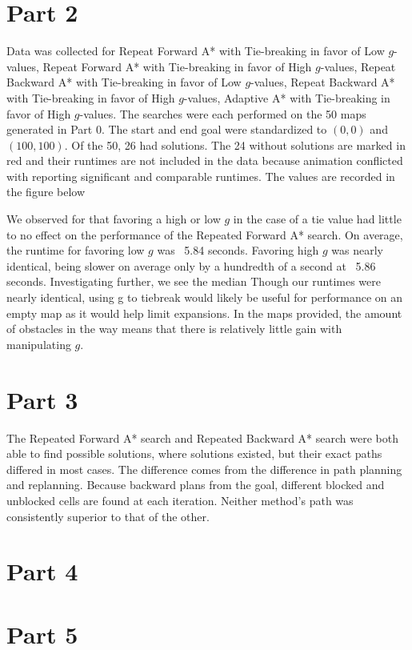 \documentclass[a4paper,12pt]{article}
\begin{document}
\section{Part 2}
Data was collected for Repeat Forward A* with Tie-breaking in favor of Low $g$-values, Repeat Forward A* with Tie-breaking in favor of High $g$-values,  Repeat Backward A* with Tie-breaking in favor of Low  $g$-values, Repeat Backward A* with Tie-breaking in favor of High $g$-values, Adaptive A* with Tie-breaking in favor of High $g$-values. The searches were each performed on the 50 maps generated in Part 0. The start and end goal were standardized to $(0,0)$ and $(100,100)$. Of the 50, 26 had solutions. The 24 without solutions are marked in red and their runtimes are not included in the data because animation conflicted with reporting significant and comparable runtimes. The values are recorded in the figure below


We observed for  that favoring a high or low $g$ in the case of a tie value had little to no effect on the performance of the Repeated Forward A* search. On average, the runtime for favoring low $g$ was ~5.84 seconds. Favoring high $g$ was nearly identical, being slower on average only by a hundredth of a second at ~5.86 seconds. Investigating further, we see the median Though our runtimes were nearly identical, using g to tiebreak would likely be useful for performance on an empty map as it would help limit expansions. In the maps provided, the amount of obstacles in the way means that there is relatively little gain with manipulating $g$. 	
\section{Part 3}
The Repeated Forward A* search and Repeated Backward A* search were both able to find possible solutions, where solutions existed, but their exact paths differed in most cases. The difference comes from the difference in path planning and replanning. Because backward plans from the goal, different blocked and unblocked cells are found at each iteration. Neither method’s path was consistently superior to that of the other. 
\section{Part 4}
\section{Part 5}
\end{document}
